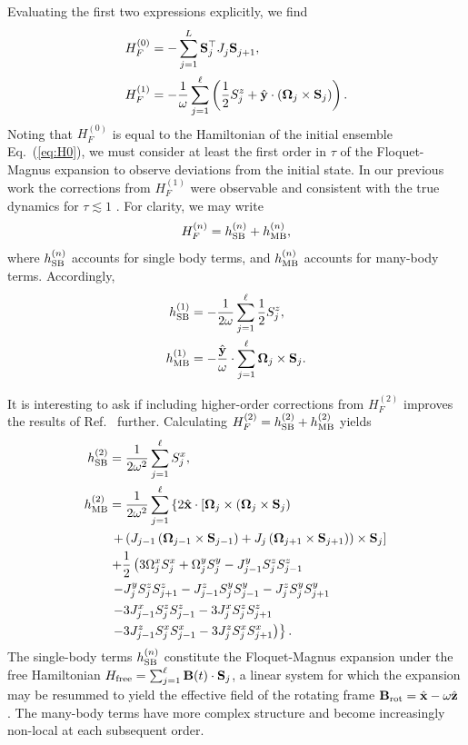 \documentclass[aps,pre,twocolumn,notitlepage,floats,10pt]{revtex4-1}
\def\ptop{{\vphantom\top}}
\newcommand{\be}{\begin{equation}}
\newcommand{\ee}{\end{equation}}
\newcommand{\beA}{\begin{equation}\begin{aligned}}
\newcommand{\eeA}{\end{aligned}\end{equation}}
\begin{document}
Evaluating the first two expressions explicitly, we find
\beA
H_F^{(0)} &= -\sum_{j=1}^L {\bf S}^\top_j J_j^\ptop {\bf S}^\ptop_{j+1},\\
H_F^{(1)} &= -\frac{1}{\omega}\sum_{j=1}^\ell
\left(
\frac{1}{2}S_j^z
+\hat{\bf y}\cdot ({\boldsymbol\Omega_j}\times {\bf S}_j)
\right).
\label{eq:HF0-HF1}
\eeA
Noting that $H_F^{(0)}$ is equal to the Hamiltonian of the initial ensemble
Eq.~(\ref{eq:H0}), we must consider at least the first order in $\tau$ of the
Floquet-Magnus expansion to observe deviations from the initial state.
In our previous work the corrections from $H_F^{(1)}$ were observable and
consistent with the true dynamics for $\tau \lesssim 1$ \cite{short-paper}.
For clarity, we may write
\be
H_F^{(n)} = h_{\rm SB}^{(n)} + h_{\rm MB}^{(n)},
\ee
where $h_{\rm SB}^{(n)}$ accounts for single body terms, and $h_{\rm MB}^{(n)}$
accounts for many-body terms.
Accordingly,
\beA
h_{\rm SB}^{(1)} &= -\frac{1}{2\omega}\sum_{j=1}^\ell
\frac{1}{2}S_j^z ,
\\
h_{\rm MB}^{(1)} &= -\frac{\hat{\bf y}}{\omega} \cdot\sum_{j=1}^\ell
{\boldsymbol\Omega_j}\times {\bf S}_j.
\eeA

It is interesting to ask if including higher-order corrections from $H_F^{(2)}$
improves the results of Ref.~\cite{short-paper} further.
Calculating $H_F^{(2)} = h_{\rm SB}^{(2)} + h_{\rm MB}^{(2)}$ yields
\beA
h_{\rm SB}^{(2)} &= \frac{1}{2\omega^2} \sum_{j=1}^\ell S_j^x, \\
h_{\rm MB}^{(2)} &=
\frac{1}{2\omega^2} \sum_{j=1}^\ell
\left\{
2\hat{\bf x} \cdot \left[
  {\boldsymbol\Omega}_j \times \left( {\boldsymbol\Omega}_j \times {\bf S}_j \right)
  \right.\right.\\
  &\left.\left. +
  \left( J_{j-1} \left( {\boldsymbol\Omega}_{j-1} \times {\bf S}_{j-1} \right)
  + J_j\left( {\boldsymbol\Omega}_{j+1} \times {\bf S}_{j+1} \right)\right)\times {\bf S}_j
  \right]\right.\\
&\left.+\frac{1}{2} \left(
3 \Omega^x_j S_j^x + \Omega_j^y S_j^y
- J_{j-1}^y S_j^z S_{j-1}^z
\right. \right.\\
&\left.\left.
- J_j^y S_j^z S_{j+1}^z
- J_{j-1}^z S_j^y S_{j-1}^y
- J_j^z S_j^y S_{j+1}^y
\right. \right.\\
&\left. \left.
-3 J_{j-1}^x S_j^z S_{j-1}^z
-3 J_j^x S_j^z S_{j+1}^z
\right.\right.\\
&\left.\left.
-3 J_{j-1}^z S_j^x S_{j-1}^x
-3 J_j^z S_j^x S_{j+1}^x
\right)
\right\}
.
\eeA
The single-body terms $h_{\rm SB}^{(n)}$ constitute the Floquet-Magnus
expansion under the free Hamiltonian $H_{\rm free}= \sum_{j=1}^\ell {\bf
B}(t)\cdot {\bf S}_j$, a linear system for which the expansion may be resummed
to yield the effective field of the rotating frame ${\bf B}_{\rm rot} = \hat{\bf
x} - \omega \hat{\bf z}$ \cite{feldman}.
The many-body terms have more complex structure and become increasingly
non-local at each subsequent order.
\end{document}
